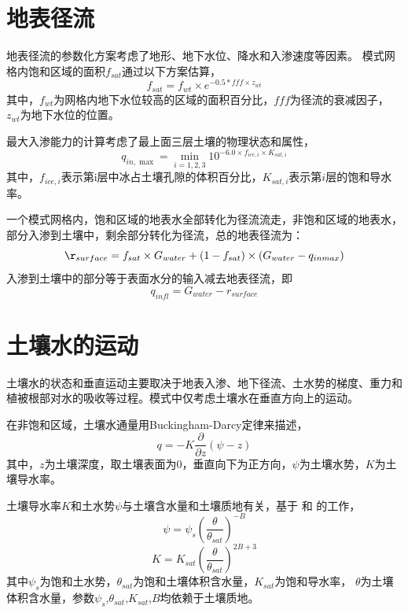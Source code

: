 \section{地表径流}
地表径流的参数化方案考虑了地形、地下水位、降水和入渗速度等因素。
模式网格内饱和区域的面积$f_{sat}$通过以下方案估算，
\begin{equation}
f_{sat}=f_{w t} \times e^{-0.5 * fff \times z_{w t}}
\end{equation}
其中，$f_{wt}$为网格内地下水位较高的区域的面积百分比，$fff$为径流的衰减因子，$z_{wt}$为地下水位的位置。

最大入渗能力的计算考虑了最上面三层土壤的物理状态和属性，
\begin{equation}
q_{i n, \max }=\min _{i=1,2,3} 10^{-6.0 \times f_{i c e, i} \times K_{sat, i}}
\end{equation}
其中，$f_{ice,i}$表示第i层中冰占土壤孔隙的体积百分比，$K_{sat,i}$表示第$i$层的饱和导水率。

一个模式网格内，饱和区域的地表水全部转化为径流流走，非饱和区域的地表水，部分入渗到土壤中，剩余部分转化为径流，总的地表径流为：
\begin{equation}
\r_{surface }=f_{sat} \times G_{water}+\left(1-f_{sat}\right) \times \left(G_{water}-q_{inmax}\right)
\end{equation}
入渗到土壤中的部分等于表面水分的输入减去地表径流，即
\begin{equation}
q_{infl}={G}_{water}-r_{surface}
\end{equation}


\section{土壤水的运动}\label{sec:土壤水的运动}
土壤水的状态和垂直运动主要取决于地表入渗、地下径流、土水势的梯度、重力和植被根部对水的吸收等过程。模式中仅考虑土壤水在垂直方向上的运动。


在非饱和区域，土壤水通量用Buckingham-Darcy定律来描述，
\begin{equation}
q=-K \frac{\partial}{\partial z}(\psi-z)
\end{equation}
其中，$z$为土壤深度，取土壤表面为0，垂直向下为正方向，$\psi$为土壤水势，$K$为土壤导水率。


土壤导水率$K$和土水势$\psi$与土壤含水量和土壤质地有关，基于 \citet{clapp1978empirical} 和 \citet{cosby1984statistical} 的工作，
\begin{equation}
\psi=\psi_{s}\left(\frac{\theta}{\theta_{sat}}\right)^{-B}
\end{equation}
\begin{equation}
K=K_{sat}\left(\frac{\theta}{\theta_{sat}}\right)^{2 B+3}
\end{equation}
其中$\psi_s$为饱和土水势，$\theta_{sat}$为饱和土壤体积含水量，$K_{sat}$为饱和导水率，
$\theta$为土壤体积含水量，参数$\psi_s$,$\theta_{sat}$,$K_{sat}$,$B$均依赖于土壤质地。


